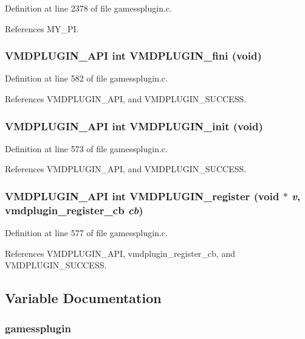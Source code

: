 Definition at line 2378 of file gamessplugin.c.

References MY\_\-PI.
\subsubsection{\setlength{\rightskip}{0pt plus 5cm}VMDPLUGIN\_\-API int VMDPLUGIN\_\-fini (void)}\label{gamessplugin_8c_a12}




Definition at line 582 of file gamessplugin.c.

References VMDPLUGIN\_\-API, and VMDPLUGIN\_\-SUCCESS.
\subsubsection{\setlength{\rightskip}{0pt plus 5cm}VMDPLUGIN\_\-API int VMDPLUGIN\_\-init (void)}\label{gamessplugin_8c_a10}




Definition at line 573 of file gamessplugin.c.

References VMDPLUGIN\_\-API, and VMDPLUGIN\_\-SUCCESS.
\subsubsection{\setlength{\rightskip}{0pt plus 5cm}VMDPLUGIN\_\-API int VMDPLUGIN\_\-register (void $\ast$ {\em v}, {\bf vmdplugin\_\-register\_\-cb} {\em cb})}\label{gamessplugin_8c_a11}




Definition at line 577 of file gamessplugin.c.

References VMDPLUGIN\_\-API, vmdplugin\_\-register\_\-cb, and VMDPLUGIN\_\-SUCCESS.

\subsection{Variable Documentation}
\subsubsection{ gamessplugin\hspace{0.3cm}{\tt  [static]}}\label{gamessplugin_8c_a3}


